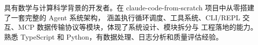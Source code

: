 \documentclass[zh]{resume}
\begin{document}
\begin{tcolorbox}[colback=accentcolor!12, colframe=accentcolor!20,
  arc=0pt, boxrule=0.3pt, left=6pt, right=6pt, top=3pt, bottom=3pt,
  sharp corners]
\makeheader
\end{tcolorbox}

\vspace{0.3em}

具有数学与计算科学背景的开发者。在 claude-code-from-scratch 项目中从零搭建了一套完整的 Agent 系统架构，
涵盖执行循环调度、工具系统、CLI/REPL 交互、MCP 数据传输协议等模块，体现了系统设计、模块拆分与
工程落地的能力。熟悉 TypeScript 和 Python，有数据处理、日志分析和质量评估经验。
\end{document}
